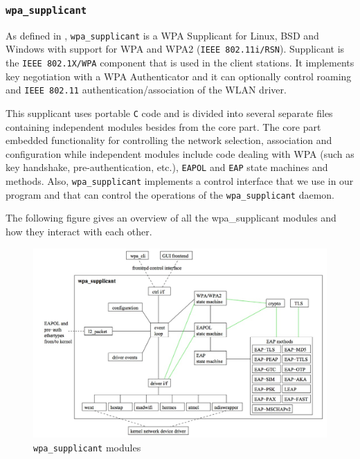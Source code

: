 \subsubsection{\texttt{wpa\_supplicant}} %
 As defined in \cite{wpa-supplicant}, \texttt{wpa\_supplicant} is a WPA Supplicant for Linux, BSD and Windows with support for WPA and WPA2 (\texttt{IEEE 802.11i/RSN}). Supplicant is the \texttt{IEEE 802.1X/WPA} component that is used in the client stations. It implements key negotiation with a WPA Authenticator and it can optionally control roaming and \texttt{IEEE 802.11} authentication/association of the WLAN driver.

 This supplicant uses portable \texttt{C} code and is divided into several separate files containing independent modules besides from the core part. The core part embedded functionality for controlling the network selection, association and configuration while independent modules include code dealing with WPA (such as key handshake, pre-authentication, etc.), \texttt{EAPOL} and \texttt{EAP} state machines and methods. Also, \texttt{wpa\_supplicant} implements a control interface that we use in our program and that can control the operations of the \texttt{wpa\_supplicant} daemon.

The following figure gives an overview of all the wpa\_supplicant modules and how they interact with each other.

 \begin{figure}[H]
 	\begin{center}
		\includegraphics[width=1\linewidth]{Pictures/chapter4/wpa-supplicant-modules.jpg}
		\caption{\texttt{wpa\_supplicant} modules}
	\end{center}
\end{figure}

